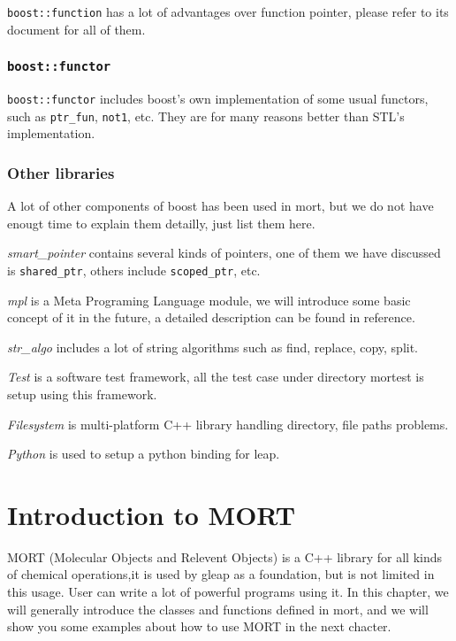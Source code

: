 \documentclass[letterpaper]{book}
\begin{document}
\lstinline$boost::function$ has a lot of advantages over function pointer, please refer to its
document for all of them.

\subsection{\lstinline$boost::functor$}

\lstinline$boost::functor$ includes boost's own implementation of some usual functors, such as
\lstinline$ptr_fun$, \lstinline$not1$, etc. They are for many reasons better than STL's implementation.


\subsection{Other libraries}
  A lot of other components of boost has been used in mort, but we do not have enougt time to
explain them detailly, just list them here.


  {\it smart\_pointer} contains several kinds of pointers, one of them we have discussed is 
\lstinline$shared_ptr$, others include \lstinline$scoped_ptr$, etc.

  {\it mpl} is a Meta Programing Language module, we will introduce some basic concept of it in
the future, a detailed description can be found in reference.

 
  {\it str\_algo} includes a lot of string algorithms such as find, replace, copy, split.


  {\it Test} is a software test framework, all the test case under directory mortest is setup
using this framework.


  {\it Filesystem} is multi-platform C++ library handling directory, file paths problems.

  
  {\it Python} is used to setup a python binding for leap.




\chapter{Introduction to MORT}
  MORT (Molecular Objects and Relevent Objects) is a C++ library for all kinds of chemical 
operations,it is used by gleap as a foundation, but is not limited in this usage. User 
can write a lot of powerful programs using it. In this chapter, we will generally introduce 
the classes and functions defined in mort, and we will show you some examples about how to
use MORT in the next chacter.
\end{document}
